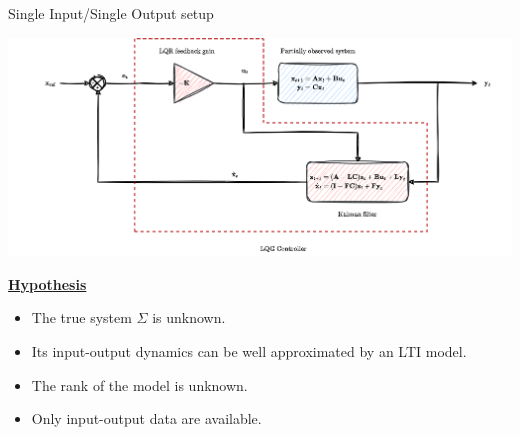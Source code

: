 \documentclass[aspectratio=169,compress,12pt,dvipsnames]{beamer}
\begin{document}
\begin{frame}[t, c]{Single Input/Single Output setup}
    \vfill
    \begin{minipage}{.48\textwidth}
        \centering
        \includegraphics[width=\textwidth]{LQG_controller.png}
    \end{minipage}%
    \hfill
    \begin{minipage}{.48\textwidth}
        \centering
        \underline{\textbf{Hypothesis}}
        \par\bigskip
        \begin{itemize}
            \item   The true system $\Sigma$ is unknown.
            \item   Its input-output dynamics can be well approximated by an LTI model.
            \item   The rank of the model is unknown.
            \item   Only input-output data are available.
        \end{itemize}
    \end{minipage}
    \vfill
\end{frame}
\end{document}

